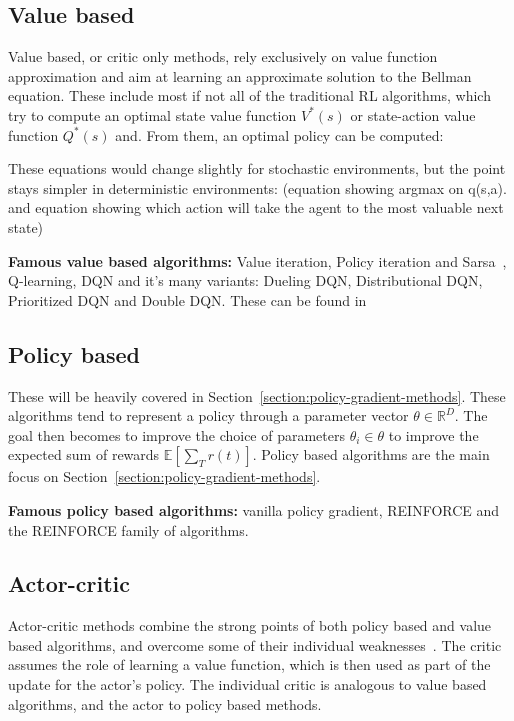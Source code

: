 \documentclass{../main.tex}{}
\begin{document}
\subsection{Value based}
Value based, or critic only methods, rely exclusively on value function approximation and aim at learning an approximate solution to the Bellman equation. These include most if not all of the traditional RL algorithms, which try to compute an optimal state value function $V^*(s)$ or state-action value function $Q^*(s)$ and. From them, an optimal policy can be computed:

These equations would change slightly for stochastic environments, but the point stays simpler in deterministic environments:
(equation showing argmax on q(s,a). and equation showing which action will take the agent to the most valuable next state)

\textbf{Famous value based algorithms:} Value iteration, Policy iteration and Sarsa~\cite{Sutton1998}, Q-learning, DQN and it's many variants: Dueling DQN, Distributional DQN, Prioritized DQN and Double DQN\@. These can be found in~\citep{Hessel2017}

\subsection{Policy based}
These will be heavily covered in Section~\ref{section:policy-gradient-methods}. These algorithms tend to represent a policy through a parameter vector $\theta
\in \mathbb{R}^D$. The goal then becomes to improve the choice of parameters
$\theta_i \in \theta$ to improve the expected sum of rewards
$\mathbb{E}[\sum_{T} r(t)]$. Policy based algorithms are the main focus on Section~\ref{section:policy-gradient-methods}.

\textbf{Famous policy based algorithms:} vanilla policy gradient, REINFORCE\citep{Williams1992} and the REINFORCE family of algorithms\@.

\subsection{Actor-critic}

Actor-critic methods combine the strong points of both policy based and value based algorithms, and overcome some of their individual weaknesses~\citep{Konda2000}. The critic assumes the role of learning a value function, which is then used as part of the update for the actor's policy. The individual critic is analogous to value based algorithms, and the actor to policy based methods.
\end{document}
